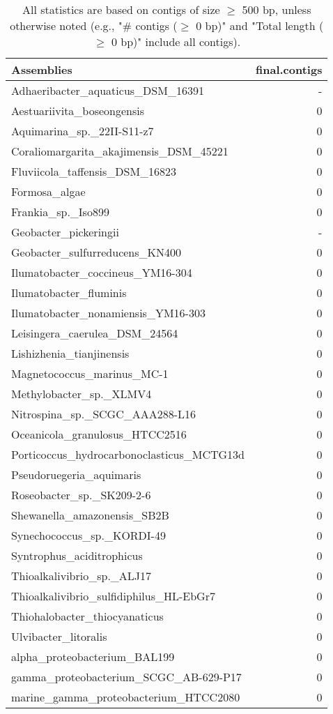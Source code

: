 \documentclass[12pt,a4paper]{article}
\begin{document}
\begin{table}[ht]
\begin{center}
\caption{All statistics are based on contigs of size $\geq$ 500 bp, unless otherwise noted (e.g., "\# contigs ($\geq$ 0 bp)" and "Total length ($\geq$ 0 bp)" include all contigs).}
\begin{tabular}{|l*{1}{|r}|}
\hline
Assemblies & final.contigs \\ \hline
Adhaeribacter\_aquaticus\_DSM\_16391 & - \\ \hline
Aestuariivita\_boseongensis & 0 \\ \hline
Aquimarina\_sp.\_22II-S11-z7 & 0 \\ \hline
Coraliomargarita\_akajimensis\_DSM\_45221 & 0 \\ \hline
Fluviicola\_taffensis\_DSM\_16823 & 0 \\ \hline
Formosa\_algae & 0 \\ \hline
Frankia\_sp.\_Iso899 & 0 \\ \hline
Geobacter\_pickeringii & - \\ \hline
Geobacter\_sulfurreducens\_KN400 & 0 \\ \hline
Ilumatobacter\_coccineus\_YM16-304 & 0 \\ \hline
Ilumatobacter\_fluminis & 0 \\ \hline
Ilumatobacter\_nonamiensis\_YM16-303 & 0 \\ \hline
Leisingera\_caerulea\_DSM\_24564 & 0 \\ \hline
Lishizhenia\_tianjinensis & 0 \\ \hline
Magnetococcus\_marinus\_MC-1 & 0 \\ \hline
Methylobacter\_sp.\_XLMV4 & 0 \\ \hline
Nitrospina\_sp.\_SCGC\_AAA288-L16 & 0 \\ \hline
Oceanicola\_granulosus\_HTCC2516 & 0 \\ \hline
Porticoccus\_hydrocarbonoclasticus\_MCTG13d & 0 \\ \hline
Pseudoruegeria\_aquimaris & 0 \\ \hline
Roseobacter\_sp.\_SK209-2-6 & 0 \\ \hline
Shewanella\_amazonensis\_SB2B & 0 \\ \hline
Synechococcus\_sp.\_KORDI-49 & 0 \\ \hline
Syntrophus\_aciditrophicus & 0 \\ \hline
Thioalkalivibrio\_sp.\_ALJ17 & 0 \\ \hline
Thioalkalivibrio\_sulfidiphilus\_HL-EbGr7 & 0 \\ \hline
Thiohalobacter\_thiocyanaticus & 0 \\ \hline
Ulvibacter\_litoralis & 0 \\ \hline
alpha\_proteobacterium\_BAL199 & 0 \\ \hline
gamma\_proteobacterium\_SCGC\_AB-629-P17 & 0 \\ \hline
marine\_gamma\_proteobacterium\_HTCC2080 & 0 \\ \hline
\end{tabular}
\end{center}
\end{table}
\end{document}
